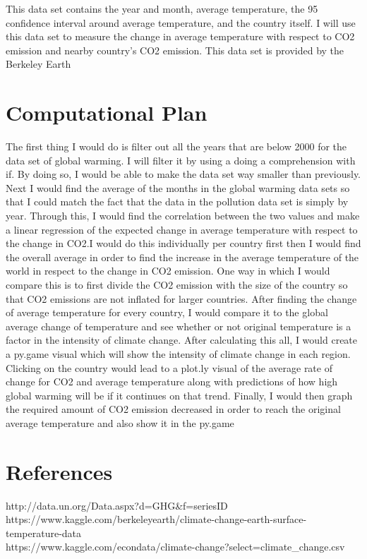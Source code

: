 \documentclass[fontsize=11pt]{article}
\begin{document}
This data set contains the year and month, average temperature, the 95 confidence interval around average temperature, and the country itself. I will use this data set to measure the change in average temperature with respect to CO2 emission and nearby country's CO2 emission. This data set is provided by the Berkeley Earth
\section*{Computational Plan}

The first thing I would do is filter out all the years that are below 2000 for the data set of global warming. I will filter it by using a doing a comprehension with if. By doing so, I would be able to make the data set way smaller than previously. Next I would find the average of the months in the global warming data sets so that I could match the fact that the data in the pollution data set is simply by year. Through this, I would find the correlation between the two values and make a linear regression of the expected change in average temperature with respect to the change in CO2.I would do this individually per country first then I would find the overall average in order to find the increase in the average temperature of the world in respect to the change in CO2 emission. One way in which I would compare this is to first divide the CO2 emission with the size of the country so that CO2 emissions are not inflated for larger countries. After finding the change of average temperature for every country, I would compare it to the global average change of temperature and see whether or not original temperature is a factor in the intensity of climate change. After calculating this all, I would create a py.game visual which will show the intensity of climate change in each region. Clicking on the country would lead to a plot.ly visual of the average rate of change for CO2 and average temperature along with predictions of how high global warming will be if it continues on that trend. Finally, I would then graph the required amount of CO2 emission decreased in order to reach the original average temperature and also show it in the py.game

\section*{References}

http://data.un.org/Data.aspx?d=GHG&f=seriesID%
\\
https://www.kaggle.com/berkeleyearth/climate-change-earth-surface-temperature-data \\
https://www.kaggle.com/econdata/climate-change?select=climate\_change.csv


\end{document}
